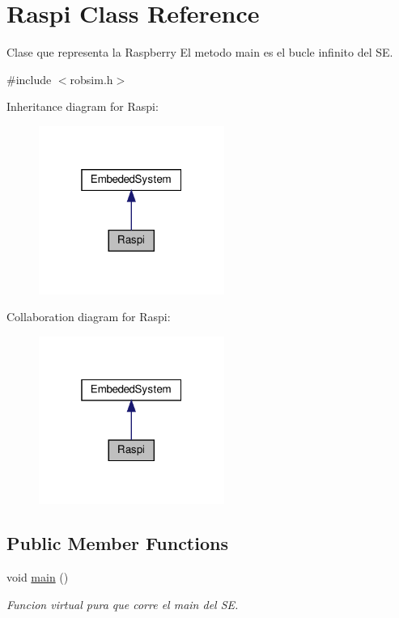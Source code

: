 \hypertarget{classRaspi}{}\section{Raspi Class Reference}
\label{classRaspi}


Clase que representa la Raspberry El metodo main es el bucle infinito del SE.  




{\ttfamily \#include $<$robsim.\+h$>$}



Inheritance diagram for Raspi\+:
\nopagebreak
\begin{figure}[H]
\begin{center}
\leavevmode
\includegraphics[width=172pt]{classRaspi__inherit__graph}
\end{center}
\end{figure}


Collaboration diagram for Raspi\+:
\nopagebreak
\begin{figure}[H]
\begin{center}
\leavevmode
\includegraphics[width=172pt]{classRaspi__coll__graph}
\end{center}
\end{figure}
\subsection*{Public Member Functions}
\begin{DoxyCompactItemize}
\item 
void \hyperlink{classRaspi_adce86197732891370a63b239cc413c7e}{main} ()
\begin{DoxyCompactList}\small\item\em Funcion virtual pura que corre el main del SE. \end{DoxyCompactList}\end{DoxyCompactItemize}


